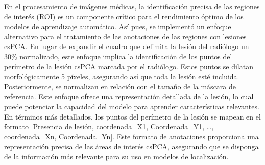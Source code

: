 En el procesamiento de imágenes médicas, la identificación precisa de las regiones de interés (ROI) es un componente crítico para el rendimiento óptimo de los modelos de aprendizaje automático. Así pues, se implementó un enfoque alternativo para el tratamiento de las anotaciones de las regiones con lesiones csPCA. En lugar de expandir el cuadro que delimita la lesión del radiólogo un 30\% normalizado, este enfoque implica la identificación de los puntos del perímetro de la lesión csPCA marcada por el radiólogo. Estos puntos se dilatan morfológicamente 5 píxeles, asegurando así que toda la lesión esté incluida. Posteriormente, se normalizan en relación con el tamaño de la máscara de referencia. Este enfoque ofrece una representación detallada de la lesión, lo cual puede potenciar la capacidad del modelo para aprender características relevantes. En términos más detallados, los puntos del perímetro de la lesión se mapean en el formato [Presencia de lesión, coordenada\_X1, Coordenada\_Y1, …, coordenada\_Xn, Coordenada\_Yn]. Este formato de anotaciones proporciona una representación precisa de las áreas de interés csPCA, asegurando que se disponga de la información más relevante para su uso en modelos de localización.





